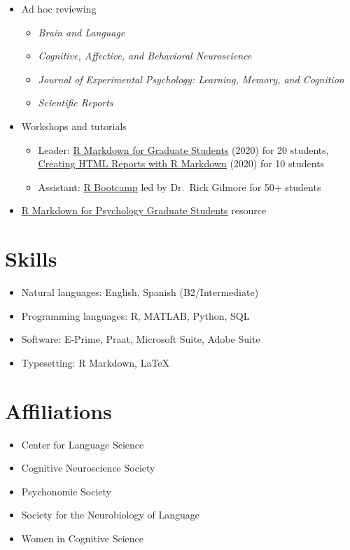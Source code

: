 \documentclass[11pt,a4paper,]{awesome-cv}
\providecommand{\tightlist}{%
	\setlength{\itemsep}{0pt}\setlength{\parskip}{0pt}}
\begin{document}
\begin{itemize}
\tightlist
\item
  Ad hoc reviewing

  \begin{itemize}
  \tightlist
  \item
    \emph{Brain and Language}
  \item
    \emph{Cognitive, Affective, and Behavioral Neuroscience}
  \item
    \emph{Journal of Experimental Psychology: Learning, Memory, and
    Cognition}
  \item
    \emph{Scientific Reports}
  \end{itemize}
\item
  Workshops and tutorials

  \begin{itemize}
  \tightlist
  \item
    Leader:
    \href{https://github.com/hollzzar/markdown-tutorial}{\underline{R Markdown for Graduate Students}}
    (2020) for 20 students,
    \href{https://github.com/hollzzar/reports-with-markdown}{\underline{Creating HTML Reports with R Markdown}}
    (2020) for 10 students
  \item
    Assistant:
    \href{https://github.com/psu-psychology/r-bootcamp-2019}{\underline{R Bootcamp}}
    led by Dr.~Rick Gilmore for 50+ students
  \end{itemize}
\item
  \href{https://www.hzaharchuk.com/rmarkdown-guide/}{\underline{R Markdown for Psychology Graduate Students}}
  resource
\end{itemize}

\hypertarget{skills}{%
\section{Skills}\label{skills}}

\begin{itemize}
\tightlist
\item
  Natural languages: English, Spanish (B2/Intermediate)
\item
  Programming languages: R, MATLAB, Python, SQL
\item
  Software: E-Prime, Praat, Microsoft Suite, Adobe Suite
\item
  Typesetting: R Markdown, \LaTeX
\end{itemize}

\hypertarget{affiliations}{%
\section{Affiliations}\label{affiliations}}

\begin{itemize}
\tightlist
\item
  Center for Language Science
\item
  Cognitive Neuroscience Society
\item
  Psychonomic Society
\item
  Society for the Neurobiology of Language
\item
  Women in Cognitive Science
\end{itemize}
\end{document}
